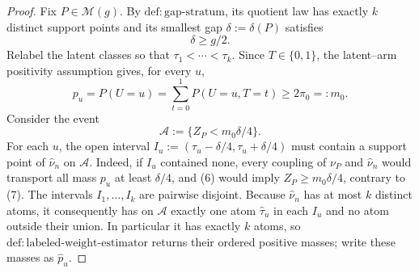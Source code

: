 \documentclass{article}
\begin{document}
\begin{proof}
Fix \(P\in\mathcal M(g)\).  By \(\mathrm{def:gap\text{-}stratum}\), its quotient law has exactly \(k\) distinct support points and its smallest gap \(\delta:=\delta(P)\) satisfies
\[
\delta\ge g/2.                                                              \tag{5}
\]
Relabel the latent classes so that \(\tau_1<\cdots<\tau_k\).  Since \(T\in\{0,1\}\), the latent--arm positivity assumption gives, for every \(u\),
\[
p_u=P(U=u)=\sum_{t=0}^1P(U=u,T=t)\ge2\pi_0=:m_0.                            \tag{6}
\]
Consider the event
\[
\mathcal A:=\{Z_P<m_0\delta/4\}.                                           \tag{7}
\]
For each \(u\), the open interval \(I_u:=(\tau_u-\delta/4,\tau_u+\delta/4)\) must contain a support point of \(\widehat\nu_n\) on \(\mathcal A\).  Indeed, if \(I_u\) contained none, every coupling of \(\nu_P\) and \(\widehat\nu_n\) would transport all mass \(p_u\) at least \(\delta/4\), and (6) would imply \(Z_P\ge m_0\delta/4\), contrary to (7).  The intervals \(I_1,\ldots,I_k\) are pairwise disjoint.  Because \(\widehat\nu_n\) has at most \(k\) distinct atoms, it consequently has on \(\mathcal A\) exactly one atom \(\widehat\tau_u\) in each \(I_u\) and no atom outside their union.  In particular it has exactly \(k\) atoms, so \(\mathrm{def:labeled\text{-}weight\text{-}estimator}\) returns their ordered positive masses; write these masses as \(\widehat p_u\).


\end{proof}
\end{document}
